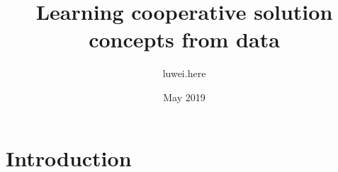 \documentclass{article}
\title{Learning cooperative solution concepts from data}
\author{luwei.here }
\date{May 2019}
\begin{document}
\maketitle

\section{Introduction}
\end{document}
